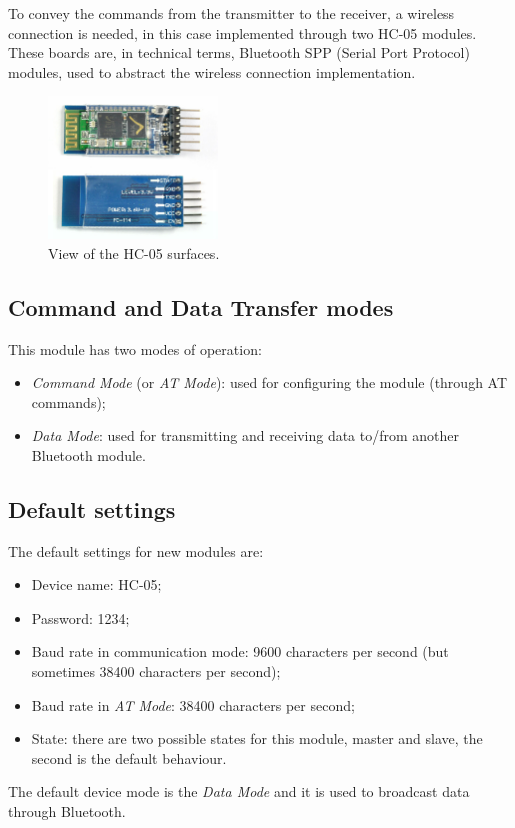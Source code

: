 To convey the commands from the transmitter to the receiver, a wireless connection is needed, in this case
implemented through two HC-05 modules. These boards are, in technical terms, Bluetooth SPP (Serial Port Protocol) modules, used to abstract the wireless connection implementation.\\

\begin{figure}[H]
	\hspace*{0.3 \textwidth}\includegraphics[width= 0.4\textwidth]
	{files/images/hc05_view}
	\caption{View of the HC-05 surfaces.}
\end{figure}

\subsection{Command and Data Transfer modes}
This module has two modes of operation:
\begin{itemize}
	\item \textit{Command Mode} (or \textit{AT Mode}): used for configuring the module (through AT commands);
	\item \textit{Data Mode}: used for transmitting and receiving data to/from another Bluetooth module.
\end{itemize}

\subsection{Default settings}
The default settings for new modules are:
\begin{itemize}
	\item Device name: HC-05;
	\item Password: 1234;
	\item Baud rate in communication mode: 9600 characters per second (but sometimes 38400 characters per second);
	\item Baud rate in \textit{AT Mode}: 38400 characters per second;
	\item State: there are two possible states for this module, master and slave, the second is the default behaviour.
\end{itemize}
The default device mode is the \textit{Data Mode} and it is used to broadcast data through Bluetooth.\\

